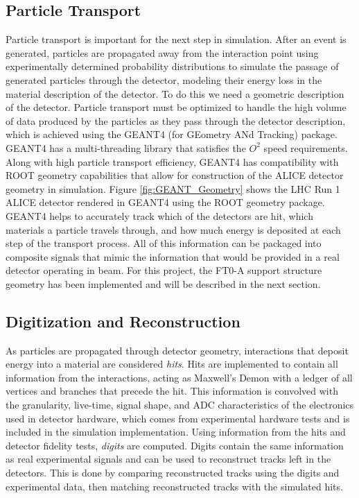 \subsection{Particle Transport}
Particle transport is important for the next step in simulation. After an event is generated, particles are propagated away from the interaction point using experimentally determined probability distributions to simulate the passage of generated particles through the detector, modeling their energy loss in the material description of the detector.  To do this we need a geometric description of the detector. Particle transport must be optimized to handle the high volume of data produced by the particles as they pass through the detector description, which is achieved using the GEANT4 (for GEometry ANd Tracking) package\cite{Geant4}. GEANT4 has a multi-threading library that satisfies the $O^2$ speed requirements. Along with high particle transport efficiency, GEANT4 has compatibility with ROOT\cite{ROOT} geometry capabilities that allow for construction of the ALICE detector geometry in simulation.  Figure \ref{fig:GEANT_Geometry} shows the LHC Run 1 ALICE detector rendered in GEANT4 using the ROOT geometry package.  GEANT4 helps to accurately track which of the detectors are hit, which materials a particle travels through, and how much energy is deposited at each step of the transport process.  All of this information can be packaged into composite signals that mimic the information that would be provided in a real detector operating in beam.  For this project, the FT0-A support structure geometry has been implemented and will be described in the next section.

\subsection{Digitization and Reconstruction}

As particles are propagated through detector geometry, interactions that deposit energy into a material are considered \textit{hits}. Hits are implemented to contain all information from the interactions, acting as Maxwell's Demon \cite{MaxwellDemon} with a ledger of all vertices and branches that precede the hit. This information is convolved with the granularity, live-time, signal shape, and ADC characteristics of the electronics used in detector hardware, which comes from experimental hardware tests and is included in the simulation implementation. Using information from the hits and detector fidelity tests, \textit{digits} are computed. Digits contain the same information as real experimental signals and can be used to reconstruct tracks left in the detectors. This is done by comparing reconstructed tracks using the digits and experimental data, then matching reconstructed tracks with the simulated hits. 

